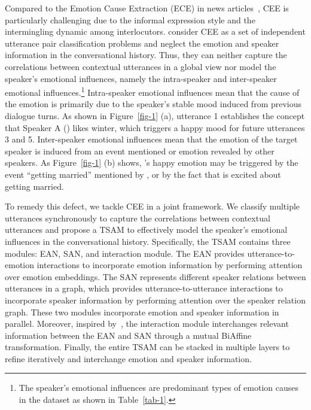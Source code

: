 \documentclass[11pt]{article}
\begin{document}
Compared to the Emotion Cause Extraction (ECE) in news articles~\citep{gui2016event,xia2019emotion}, CEE is particularly challenging due to the informal expression style and the intermingling dynamic among interlocutors. 
\citet{poria2021recognizing} consider CEE as a set of independent utterance pair classification problems and neglect the emotion and speaker information in the conversational history. Thus, they can neither capture the correlations between contextual utterances in a global view nor model the speaker's emotional influences, namely the intra-speaker and inter-speaker emotional influences.\footnote{The speaker's emotional influences are predominant types of emotion causes in the dataset as shown in Table~\ref{tab-1}.}
Intra-speaker emotional influences mean that the cause of the emotion is primarily due to the speaker's stable mood induced from previous dialogue turns. As shown in Figure~\ref{fig-1} (a), utterance 1 establishes the concept that Speaker A () likes winter, which triggers a happy mood for future utterances 3 and 5. Inter-speaker emotional influences mean that the emotion of the target speaker is induced from an event mentioned or emotion revealed by other speakers. As Figure~\ref{fig-1} (b) shows, 's happy emotion may be triggered by the event ``getting married'' mentioned by , or by the fact that  is excited about getting married. 

To remedy this defect, we tackle CEE in a joint framework. We classify multiple utterances synchronously to capture the correlations between contextual utterances and propose a TSAM to effectively model the speaker's emotional influences in the conversational history. Specifically, the TSAM contains three modules: EAN, SAN, and interaction module. The EAN provides utterance-to-emotion interactions to incorporate emotion information by performing attention over emotion embeddings. The SAN represents different speaker relations between utterances in a graph, which provides utterance-to-utterance interactions to incorporate speaker information by performing attention over the speaker relation graph. These two modules incorporate emotion and speaker information in parallel. Moreover, inspired by~\citep{li2021dual,tang2020dependency}, the interaction module interchanges relevant information between the EAN and SAN through a mutual BiAffine transformation. Finally, the entire TSAM can be stacked in multiple layers to refine iteratively and interchange emotion and speaker information.
\end{document}

